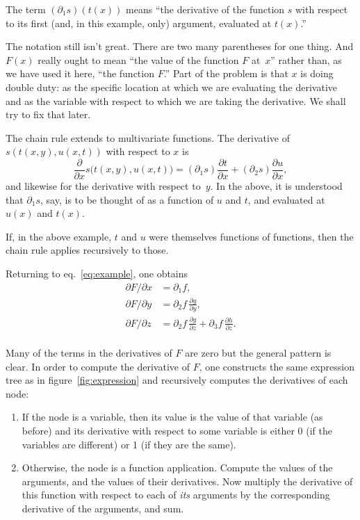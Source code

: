 \documentclass[11pt, a4paper]{article}
\begin{document}
The term $(\partial_1s)(t(x))$ means ``the derivative of the function $s$ with
respect to its first (and, in this example, only) argument, evaluated
at $t(x)$.''

The notation still isn't great. There are two many parentheses for one
thing. And $F(x)$ really ought to mean ``the value of the function $F$
at~$x$'' rather than, as we have used it here, ``the function $F$.''
Part of the problem is that $x$ is doing double duty: as the specific
location at which we are evaluating the derivative and as the variable
with respect to which we are taking the derivative. We shall try to
fix that later.

The chain rule extends to multivariate functions. The derivative of
$s(t(x,y),u(x,t))$ with respect to $x$ is
\begin{equation*}
  \frac{\partial }{\partial x} s\bigl(t(x,y),u(x,t)\bigr) =
  (\partial_1s) \frac{\partial t}{\partial x} 
  + (\partial_2s) \frac{\partial u}{\partial x},
\end{equation*}
and likewise for the derivative with respect to~$y$. In the above, it
is understood that $\partial_1s$, say, is to be thought of as a function of
$u$ and $t$, and evaluated at $u(x)$ and $t(x)$.

If, in the above example, $t$ and $u$ were themselves functions of
functions, then the chain rule applies recursively to
those.

Returning to eq.~\eqref{eq:example}, one obtains
\begin{equation*}
  \begin{aligned}
    \partial F / \partial x &= \partial_1 f, \\
    \partial F / \partial y &= \partial_2 f\,\frac{\partial g}{\partial y}, \\
    \partial F / \partial z &= \partial_2 f\,\frac{\partial g}{\partial z} 
                      + \partial_3f\,\frac{\partial h}{\partial z}. \\
  \end{aligned}
\end{equation*}

Many of the terms in the derivatives of $F$ are zero but the general
pattern is clear. In order to compute the derivative of $F$, one
constructs the same expression tree as in figure~\ref{fig:expression}
and recursively computes the derivatives of each node:
\begin{enumerate}
\item If the node is a variable, then its value is the value of that
  variable (as before) and its derivative with respect to some
  variable is either 0 (if the variables are different) or 1 (if they
  are the same). 
\item Otherwise, the node is a function application. Compute the values
  of the arguments, and the values of their derivatives. Now multiply
  the derivative of this function with respect to each of \emph{its}
  arguments by the corresponding derivative of the arguments, and sum. 
\end{enumerate}
\end{document}
